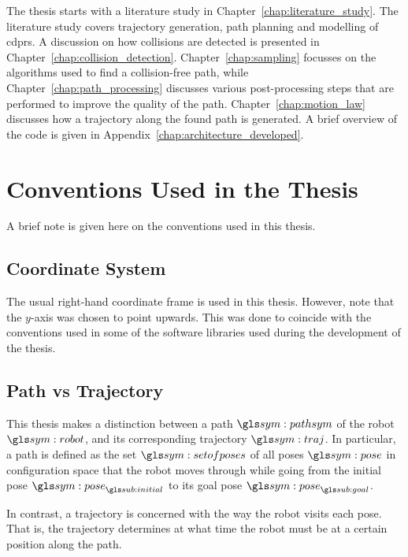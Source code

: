 		The thesis starts with a literature study in
		Chapter~\ref{chap:literature_study}. The literature study covers
		trajectory generation, path planning and modelling of \glspl{cdpr}.  A
		discussion on how collisions are detected is presented in
		Chapter~\ref{chap:collision_detection}. Chapter~\ref{chap:sampling}
		focusses on the algorithms used to find a collision-free path, while
		Chapter~\ref{chap:path_processing} discusses various post-processing
		steps that are performed to improve the quality of the path.
		Chapter~\ref{chap:motion_law} discusses how a trajectory along the found
		path is generated. A brief overview of the code is given in
		Appendix~\ref{chap:architecture_developed}.

	\section{Conventions Used in the Thesis}

		A brief note is given here on the conventions used in this thesis.

		\subsection{Coordinate System}

			The usual right-hand coordinate frame is used in this thesis.
			However, note that the $y$-axis was chosen to point upwards. This
			was done to coincide with the conventions used in some of the
			software libraries used during the development of the thesis.

		\subsection{Path vs Trajectory}

			This thesis makes a distinction between a path $\pathsym$ of the
			robot $\robot$, and its corresponding trajectory $\traj$. In
			particular, a path is defined as the set $\setofposes$ of all poses
			$\pose$ in configuration space that the robot moves through while
			going from the initial pose $\pose_{\initial}$ to its goal pose
			$\pose_{\goal}$.

			In contrast, a trajectory is concerned with the way the robot visits
			each pose. That is, the trajectory determines at what time the robot
			must be at a certain position along the path.
